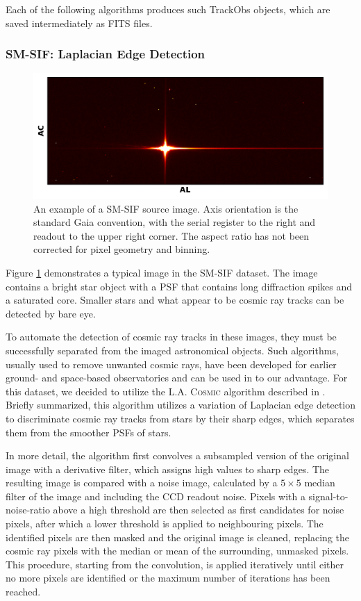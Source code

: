 \documentclass[a4paper, 11pt]{article}
\begin{document}
Each of the following algorithms produces such TrackObs objects, which are saved intermediately as FITS files.




\subsubsection{SM-SIF: Laplacian Edge Detection}
\label{sec:extrSM-SIF}
\begin{figure}
  \centering
  \includegraphics{images/extraction/SM_full_image}
  \caption{An example of a SM-SIF source image. Axis orientation is the standard Gaia convention, with the serial register to the right and readout to the upper right corner. The aspect ratio has not been corrected for pixel geometry and binning.}
  \label{fig:SM_full}
\end{figure}

Figure \ref{fig:SM_full} demonstrates a typical image in the SM-SIF dataset. The image contains a bright star object with a PSF that contains long diffraction spikes and a saturated core. Smaller stars and what appear to be cosmic ray tracks can be detected by bare eye.

To automate the detection of cosmic ray tracks in these images, they must be successfully separated from the imaged astronomical objects. Such algorithms, usually used to remove unwanted cosmic rays, have been developed for earlier ground- and space-based observatories and can be used in to our advantage. For this dataset, we decided to utilize the \textsc{L.A. Cosmic} algorithm described in \cite{Dokkum_cosmics}. Briefly summarized, this algorithm utilizes a variation of Laplacian edge detection to discriminate cosmic ray tracks from stars by their sharp edges, which separates them from the smoother PSFs of stars.

In more detail, the algorithm first convolves a subsampled version of the original image with a derivative filter, which assigns high values to sharp edges. The resulting image is compared with a noise image, calculated by a $5 \times 5$ median filter of the image and including the CCD readout noise. Pixels with a signal-to-noise-ratio above a high threshold are then selected as first candidates for noise pixels, after which a lower threshold is applied to neighbouring pixels. The identified pixels are then masked and the original image is cleaned, replacing the cosmic ray pixels with the median or mean of the surrounding, unmasked pixels. This procedure, starting from the convolution, is applied iteratively until either no more pixels are identified or the maximum number of iterations has been reached.
\end{document}

